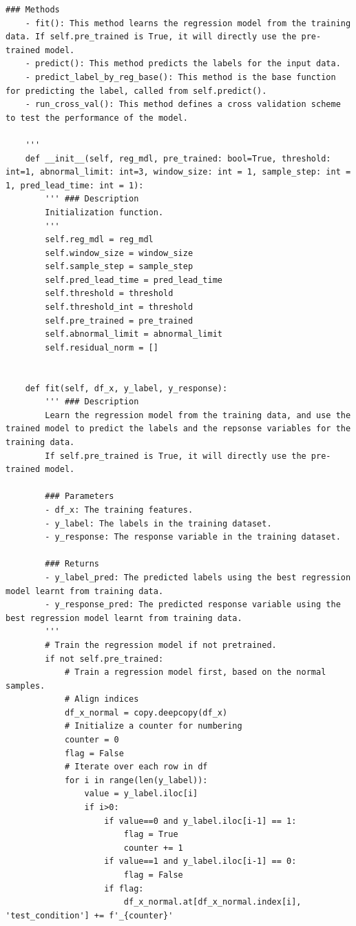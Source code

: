 \documentclass[11pt,a4paper]{article}
\begin{document}
\begin{lstlisting}[style=pyfull]
    ### Methods
    - fit(): This method learns the regression model from the training data. If self.pre_trained is True, it will directly use the pre-trained model.
    - predict(): This method predicts the labels for the input data.
    - predict_label_by_reg_base(): This method is the base function for predicting the label, called from self.predict().
    - run_cross_val(): This method defines a cross validation scheme to test the performance of the model.

    '''
    def __init__(self, reg_mdl, pre_trained: bool=True, threshold: int=1, abnormal_limit: int=3, window_size: int = 1, sample_step: int = 1, pred_lead_time: int = 1):
        ''' ### Description
        Initialization function.
        '''
        self.reg_mdl = reg_mdl
        self.window_size = window_size
        self.sample_step = sample_step
        self.pred_lead_time = pred_lead_time
        self.threshold = threshold
        self.threshold_int = threshold
        self.pre_trained = pre_trained
        self.abnormal_limit = abnormal_limit
        self.residual_norm = []


    def fit(self, df_x, y_label, y_response):
        ''' ### Description
        Learn the regression model from the training data, and use the trained model to predict the labels and the repsonse variables for the training data.
        If self.pre_trained is True, it will directly use the pre-trained model.

        ### Parameters
        - df_x: The training features.
        - y_label: The labels in the training dataset.
        - y_response: The response variable in the training dataset.

        ### Returns
        - y_label_pred: The predicted labels using the best regression model learnt from training data.
        - y_response_pred: The predicted response variable using the best regression model learnt from training data.
        '''
        # Train the regression model if not pretrained.
        if not self.pre_trained:
            # Train a regression model first, based on the normal samples.
            # Align indices
            df_x_normal = copy.deepcopy(df_x)
            # Initialize a counter for numbering
            counter = 0
            flag = False
            # Iterate over each row in df
            for i in range(len(y_label)):
                value = y_label.iloc[i]
                if i>0:
                    if value==0 and y_label.iloc[i-1] == 1:
                        flag = True
                        counter += 1
                    if value==1 and y_label.iloc[i-1] == 0:
                        flag = False
                    if flag:
                        df_x_normal.at[df_x_normal.index[i], 'test_condition'] += f'_{counter}'


\end{lstlisting}
\end{document}
